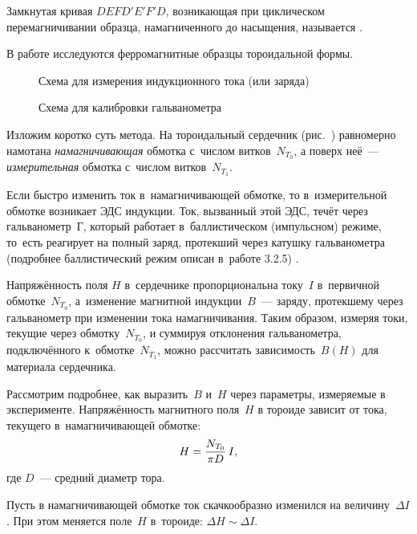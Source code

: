 Замкнутая кривая $DEFD'E'F'D$, возникающая при циклическом перемагничивании образца, намагниченного до насыщения,
называется .

В работе исследуются ферромагнитные образцы тороидальной формы.

\begin{figure}[h!]
	\centering
	\begin{minipage}{.48\textwidth}
		\caption{Схема для измерения индукционного тока (или заряда)}
	\end{minipage}
	\begin{minipage}{.48\textwidth}
		\caption{Схема для калибровки гальванометра}
	\end{minipage}
\end{figure}

Изложим коротко суть метода. На тороидальный сердечник (рис.~) равномерно намотана \emph{намагничивающая} обмотка
с~числом витков~$N_{T_0}$, а поверх неё~--- \emph{измерительная} обмотка с~числом витков~$N_{T_1}$.

Если быстро изменить ток в~намагничивающей обмотке, то в~измерительной обмотке возникает ЭДС индукции. Ток, вызванный
этой ЭДС, течёт через гальванометр~Г, который работает в~баллистическом (импульсном) режиме, то~есть реагирует на полный
заряд, протекший через катушку гальванометра (подробнее баллистический режим описан в~работе 3.2.5) .

Напряжённость поля $H$ в~сердечнике пропорциональна току~$I$ в~первичной обмотке~$N_{T_0}$, а~изменение магнитной
индукции~$B$~--- заряду, протекшему через гальванометр при изменении тока намагничивания. Таким образом, измеряя токи,
текущие через обмотку~$N_{T_0}$, и суммируя отклонения гальванометра, подключённого к~обмотке~$N_{T_1}$, можно рассчитать
зависимость~$B(H)$ для материала сердечника.

Рассмотрим подробнее, как выразить~$B$ и~$H$ через параметры, измеряемые в эксперименте. Напряжённость магнитного
поля~$H$ в тороиде зависит от тока, текущего в~намагничивающей обмотке:
\begin{equation}
	\eqmark{2}
	H=\frac{N_{T_0}}{\pi D}\,I,
\end{equation}
где $D$~--- средний диаметр тора.

Пусть в намагничивающей обмотке ток скачкообразно изменился на величину~$\Delta I$. При этом меняется поле~$H$ в~тороиде:
$\Delta H\sim\Delta I$.

